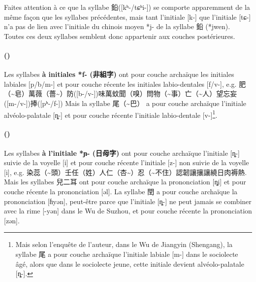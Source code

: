 \documentclass{scrbook}
\newcounter{c}[subsubsection]
\newcommand{\stpc}[1]{\stepcounter{#1}}
\newcommand{\bolang}{\textasciitilde}
\newcommand{\termyyx}[1]{\textbf{#1}}
\begin{document}
\begin{sloppypar}
Faites attention à ce que la syllabe 鉛([kʰ-/tɕʰi-]) se comporte apparemment de la même façon que les syllabes précédentes, mais tant l'initiale [k-] que l'initiale [tɕ-] n'a pas de lien avec l'initiale du chinois moyen *j- de la syllabe 鉛 (*jwen). Toutes ces deux syllabes semblent donc appartenir aux couches postérieures.



\stpc{c}\paragraph{()}
Les syllabes \termyyx{à initiales *f- (非組字)} ont pour couche archaïque les initiales labiales [p/b/m-] et pour couche récente les initiales labio-dentales [f/v-], e.g. 肥（\bolang 皂）萬薇（薔\bolang ）防([b-/v-])味萬蚊聞（嗅）問物（\bolang 事）亡（\bolang 人）望忘妄([m-/v-])捧([pʰ-/f-]) Mais la syllabe 尾（\bolang 巴） a pour couche archaïque l'initiale alvéolo-palatale [ȵ-] et pour couche récente l'initiale labio-dentale [v-]\footnote{Mais selon l'enquête de l'auteur, dans le Wu de Jiangyin (Shengang), la syllabe 尾 a pour couche archaïque l'initiale labiale [m-] dans le sociolecte âgé, alors que dans le sociolecte jeune, cette initiale devient alvéolo-palatale [ȵ-].}.



\stpc{c}\paragraph{()}
Les syllabes \termyyx{à l'initiale *ɲ- (日母字)} ont pour couche archaïque l'initiale [ȵ-] suivie de la voyelle [i] et pour couche récente l'initiale [z-] non suivie de la voyelle [i], e.g. 染蕊（\bolang 頭）壬任（姓）人仁（杏\bolang ）忍（\bolang 不住）認韌讓攘讓繞日肉褥熱. Mais les syllabes 兒二耳 ont pour couche archaïque la prononciation [ȵi] et pour couche récente la prononciation [əl]. La syllabe 閏 a pour couche archaïque la prononciation [ɦyən], peut-être parce que l'initiale [ȵ-] ne peut jamais se combiner avec la rime [-yən] dans le Wu de Suzhou, et pour couche récente la prononciation [zən].


\end{sloppypar}
\end{document}
